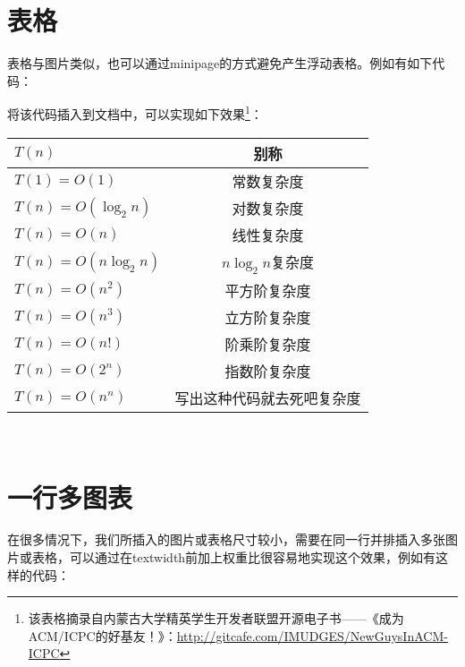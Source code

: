     \section{表格}
        表格与图片类似，也可以通过minipage的方式避免产生浮动表格。例如有如下代码：
        

        将该代码插入到文档中，可以实现如下效果\footnote{该表格摘录自内蒙古大学精英学生开发者联盟开源电子书——《成为ACM/ICPC的好基友！》：\url{http://gitcafe.com/IMUDGES/NewGuysInACM-ICPC}}：
        \\[\intextsep]
            \begin{minipage}{\textwidth}
                \centering 
                \begin{tabular}{|l|c|}
                    \hline
                        $T(n)$ & 别称 \\
                    \hline
                        $T(1)=O(1)$ & 常数复杂度\\
                        $T(n)=O(\log_{2}n)$ & 对数复杂度\\
                        $T(n)=O(n)$ & 线性复杂度\\
                        $T(n)=O(n\log_{2}n)$ & $n\log_{2}n$复杂度\\
                        $T(n)=O(n^2)$ & 平方阶复杂度\\
                        $T(n)=O(n^3)$ & 立方阶复杂度\\
                        $T(n)=O(n!)$ & 阶乘阶复杂度\\
                        $T(n)=O(2^n)$ & 指数阶复杂度\\
                        $T(n)=O(n^n)$ & 写出这种代码就去死吧复杂度\\
                    \hline
                \end{tabular}
                \label{tab:complexity} 
            \end{minipage}
        \\[\intextsep] 

    \section{一行多图表}
        在很多情况下，我们所插入的图片或表格尺寸较小，需要在同一行并排插入多张图片或表格，可以通过在\tbs textwidth前加上权重比很容易地实现这个效果，例如有这样的代码：
        

